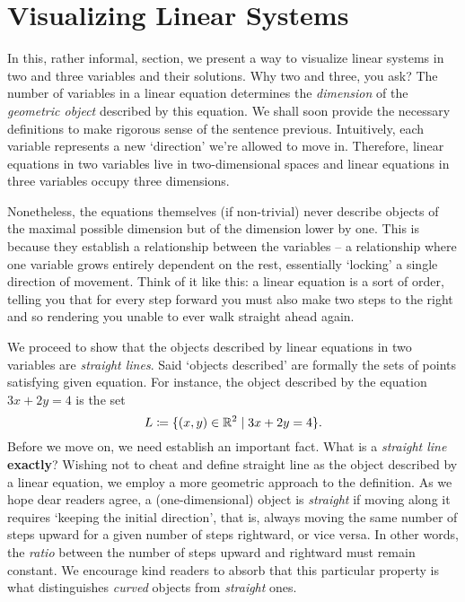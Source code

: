 \section{Visualizing Linear Systems}
\label{sec:visualizing-linear-systems}

In this, rather informal, section, we present a way to visualize linear systems
in two and three variables and their solutions. Why two and three, you ask? The
number of variables in a linear equation determines the \emph{dimension} of the
\emph{geometric object} described by this equation. We shall soon provide the
necessary definitions to make rigorous sense of the sentence previous.
Intuitively, each variable represents a new `direction' we're allowed to move
in. Therefore, linear equations in two variables live in two-dimensional spaces
and linear equations in three variables occupy three dimensions.

Nonetheless, the equations themselves (if non-trivial) never describe objects of
the maximal possible dimension but of the dimension lower by one. This is
because they establish a relationship between the variables -- a relationship
where one variable grows entirely dependent on the rest, essentially `locking' a
single direction of movement. Think of it like this: a linear equation is a sort
of order, telling you that for every step forward you must also make two steps
to the right and so rendering you unable to ever walk straight ahead again.

We proceed to show that the objects described by linear equations in two
variables are \emph{straight lines}. Said `objects described' are formally the
sets of points satisfying given equation. For instance, the object described by
the equation $3x + 2y = 4$ is the set
\[
 L \coloneqq \{(x,y) \in \mathbb{R}^2 \mid 3x + 2y = 4\}.
\]
Before we move on, we need establish an important fact. What is a \emph{straight
line} \textbf{exactly}? Wishing not to cheat and define straight line as the
object described by a linear equation, we employ a more geometric approach to
the definition. As we hope dear readers agree, a (one-dimensional) object is
\emph{straight} if moving along it requires `keeping the initial direction',
that is, always moving the same number of steps upward for a given number of
steps rightward, or vice versa. In other words, the \emph{ratio} between the
number of steps upward and rightward must remain constant. We encourage kind
readers to absorb that this particular property is what distinguishes
\emph{curved} objects from \emph{straight} ones.

